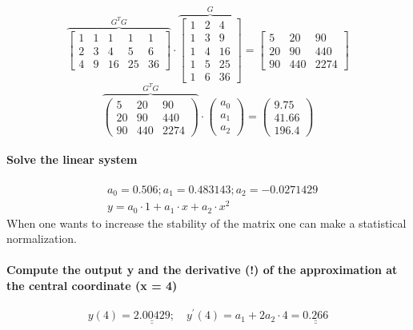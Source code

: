 $$
\overbrace{\left[\begin{array}{ccccc}
1 & 1 & 1 & 1 & 1 \\
2 & 3 & 4 & 5 & 6 \\
4 & 9 & 16 & 25 & 36
\end{array}\right]}^{G^{T}G} \cdot \overbrace{\left[\begin{array}{ccc}
1 & 2 & 4 \\
1 & 3 & 9 \\
1 & 4 & 16 \\
1 & 5 & 25 \\
1 & 6 & 36
\end{array}\right]}^G=
\left[\begin{array}{ccc}
5 & 20 & 90 \\
20 & 90 & 440 \\
90 & 440 & 2274
\end{array}\right]
$$
\begin{equation}\label{eq:least_squre_system_of_normal_equations}
\overbrace{\left(\begin{array}{ccc}
5 & 20 & 90 \\
20 & 90 & 440 \\
90 & 440 & 2274
\end{array}\right)}^{G^{T}G} \cdot\left(\begin{array}{l}
a_0 \\
a_1 \\
a_2
\end{array}\right)=\left(\begin{array}{c}
9.75 \\
41.66 \\
196.4
\end{array}\right)
\end{equation}
\paragraph{Solve the linear system}
$$
\begin{aligned}
&a_0=0.506 ; a_1=0.483143 ; a_2=-0.0271429 \\
&y=a_0 \cdot 1+a_1 \cdot x+a_2\cdot x^2
\end{aligned}
$$
When one wants to increase the stability of the matrix one can make a statistical normalization.
\paragraph{Compute the output y and the derivative (!) of the approximation at the central coordinate (x = 4)} \label{par:result1}
$$
y(4)=\underline{\underline{2.00429}} ; \quad y^{\prime}(4)=a_1+2 a_2 \cdot 4=\underline{\underline{0.266}}
$$

